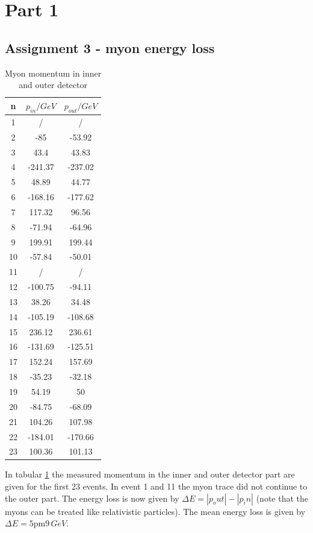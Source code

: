 \section{Part 1}
\subsection{Assignment 3 - myon energy loss}

\begin{table}
\centering
\caption{Myon momentum in inner and outer detector}
\begin{tabular}{ccc}
\toprule
n & $p_{in}/\si{GeV}$ & $p_{out}/\si{GeV}$\\
\midrule
1 & / & /\\
2&	-85&	-53.92\\
3&	43.4&	43.83\\
4&	-241.37&	-237.02\\
5&	48.89&	44.77\\
6&	-168.16&	-177.62\\
7&	117.32&	96.56\\
8&	-71.94&	-64.96\\
9&	199.91&	199.44\\
10&	-57.84&	-50.01\\
11&	/ & /\\
12&-100.75&	-94.11\\
13&	38.26&	34.48\\
14&	-105.19&	-108.68\\
15&	236.12&	236.61\\
16&	-131.69&	-125.51\\
17&	152.24&	157.69\\
18&	-35.23&	-32.18\\
19&	54.19&	50\\
20&	-84.75&	-68.09\\
21&	104.26&	107.98\\
22&	-184.01&	-170.66\\
23&	100.36&	101.13\\
\bottomrule
\end{tabular}
\label{tab:task1_myon}
\end{table}

In tabular \ref{tab:task1_myon} the measured momentum in the inner and outer detector part are given for the first 23 events. In event 1 and 11 the myon trace did not continue to the outer part. The energy loss is now given by $\Delta E = |p_out| - |p_in|$ (note that the myons can be treated like relativistic particles). The mean energy loss is given by $\Delta E = \si{5 \pm 9\,GeV}$.

